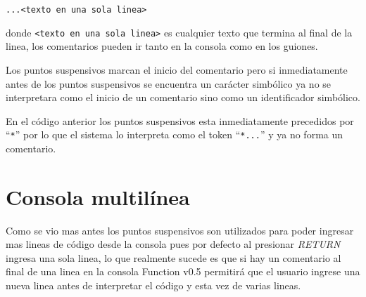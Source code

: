          \texttt{...<texto en una sola linea>}
      
      donde \texttt{<texto en una sola linea>} es cualquier texto que termina al final de la linea, los comentarios pueden ir tanto en la consola como en los guiones.
      
      \begin{fxcode}
      \end{fxcode}
      \begin{fxcode}
      \end{fxcode}
      
      Los puntos suspensivos marcan el inicio del comentario pero si inmediatamente antes de los puntos suspensivos se encuentra un carácter simbólico ya no se interpretara como el inicio de un comentario sino como un identificador simbólico.
      
      \begin{fxcode}
      \end{fxcode}
      
      En el código anterior los puntos suspensivos esta inmediatamente precedidos por ``\texttt{*}'' por lo que el sistema lo interpreta como el token ``\texttt{*...}'' y ya no forma un comentario.
      
   \section{Consola multilínea}
      Como se vio mas antes los puntos suspensivos son utilizados para poder ingresar mas lineas de código desde la consola pues por defecto al presionar {\it RETURN} ingresa una sola linea, lo que realmente sucede es que si hay un comentario al final de una linea en la consola Function v0.5 permitirá que el usuario ingrese una nueva linea antes de interpretar el código y esta vez de varias lineas.
      
      \begin{fxcode}
         \\
         \\
         \\
         \\
         \\
      \end{fxcode}
   

